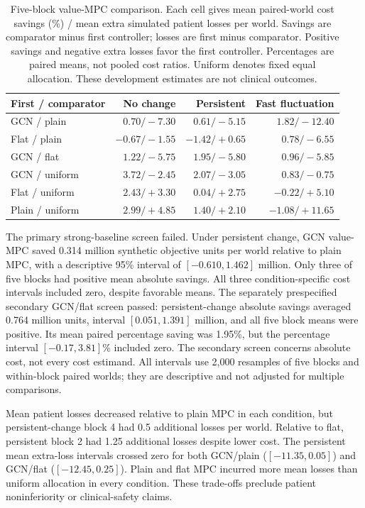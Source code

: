 \documentclass[preprint,review,12pt]{elsarticle}
\begin{document}
\begin{table}[htbp]
\centering
\small
\caption{Five-block value-MPC comparison. Each cell gives mean paired-world
cost savings (\%) / mean extra simulated patient losses per world. Savings
are comparator minus first controller; losses are first minus comparator.
Positive savings and negative extra losses favor the first controller.
Percentages are paired means, not pooled cost ratios. Uniform denotes fixed
equal allocation. These development estimates are not clinical outcomes.}
\label{tab:value-mpc-strong-comparison}
\setlength{\tabcolsep}{3pt}
\begin{tabularx}{\textwidth}{@{}Xrrr@{}}
\toprule
First / comparator & No change & Persistent & Fast fluctuation \\
\midrule
GCN / plain & $0.70/-7.30$ & $0.61/-5.15$ & $1.82/-12.40$ \\
Flat / plain & $-0.67/-1.55$ & $-1.42/+0.65$ & $0.78/-6.55$ \\
GCN / flat & $1.22/-5.75$ & $1.95/-5.80$ & $0.96/-5.85$ \\
GCN / uniform & $3.72/-2.45$ & $2.07/-3.05$ & $0.83/-0.75$ \\
Flat / uniform & $2.43/+3.30$ & $0.04/+2.75$ & $-0.22/+5.10$ \\
Plain / uniform & $2.99/+4.85$ & $1.40/+2.10$ & $-1.08/+11.65$ \\
\bottomrule
\end{tabularx}
\end{table}

The primary strong-baseline screen failed. Under persistent change, GCN
value-MPC saved 0.314 million synthetic objective units per world relative
to plain MPC, with a descriptive 95\% interval of $[-0.610,1.462]$ million.
Only three of five blocks had positive mean absolute savings. All three
condition-specific cost intervals included zero, despite favorable means.
The separately prespecified secondary GCN/flat screen passed: persistent-change
absolute savings averaged 0.764 million units, interval $[0.051,1.391]$ million,
and all five block means were positive. Its mean paired percentage saving was
1.95\%, but the percentage interval $[-0.17,3.81]$\% included zero. The secondary
screen concerns absolute cost, not every cost estimand. All intervals use 2,000
resamples of five blocks and within-block paired worlds; they are descriptive
and not adjusted for multiple comparisons.

Mean patient losses decreased relative to plain MPC in each condition, but
persistent-change block 4 had 0.5 additional losses per world. Relative to
flat, persistent block 2 had 1.25 additional losses despite lower cost. The
persistent mean extra-loss intervals crossed zero for both GCN/plain
($[-11.35,0.05]$) and GCN/flat ($[-12.45,0.25]$). Plain and flat MPC incurred
more mean losses than uniform allocation in every condition. These trade-offs
preclude patient noninferiority or clinical-safety claims.
\end{document}

